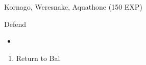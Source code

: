 \begin{paracol}{2}
\begin{encounter}{Kornago, Weresnake, Aquathone (150 EXP)}
	\varwb
	\begin{notes}
		\item {}
	\end{notes}
	\begin{round}{1}
		\faris \leftCommand{\throw} \then \airBlade \space \then {}
        \galuf Defend
        \bartz \leftCommand{\gilToss}
        \lenna \leftCommand{\catch}
	\end{round}
    \begin{itemize}
        \item {}
    \end{itemize}
	\varwe
\end{encounter}

\begin{enumerate}[resume]
    \item Return to Bal
\end{enumerate}

\end{paracol}